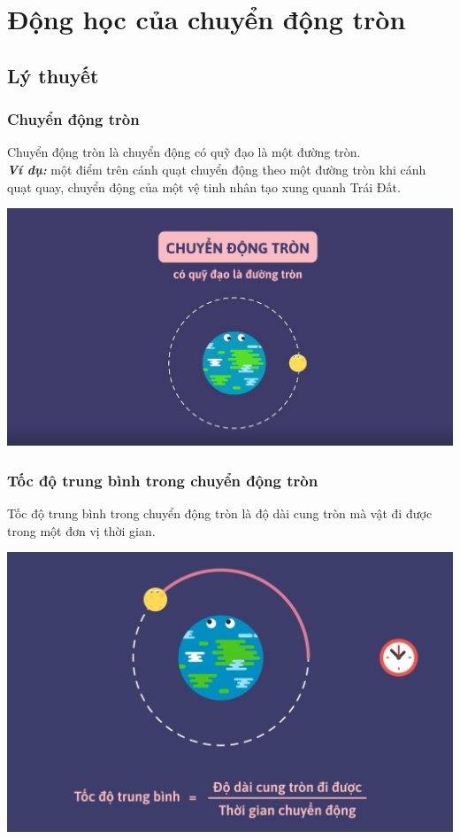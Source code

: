 \let\lesson\undefined
\newcommand{\lesson}{\phantomlesson{Bài 21: Động học của chuyển động tròn.}}
\chapter[Động học của chuyển động tròn]{Động học của chuyển động tròn}
\setcounter{section}{0}
\section{Lý thuyết}
\subsection{Chuyển động tròn}
Chuyển động tròn là chuyển động có quỹ đạo là một đường tròn.\\
\textbf{\textit{Ví dụ:}} một điểm trên cánh quạt chuyển động theo một đường tròn khi cánh quạt quay, chuyển động của một vệ tinh nhân tạo xung quanh Trái Đất.
\begin{center}
	\includegraphics[scale=0.3]{../figs/VN10-PH-06-L-005-1-V2-01.jpg}
\end{center}
\subsection{Tốc độ trung bình trong chuyển động tròn}
 Tốc độ trung bình trong chuyển động tròn là độ dài cung tròn mà vật đi được trong một đơn vị thời gian.
\begin{center}
	\includegraphics[scale=0.3]{../figs/VN10-PH-06-L-005-1-V2-02.jpg}
\end{center}
